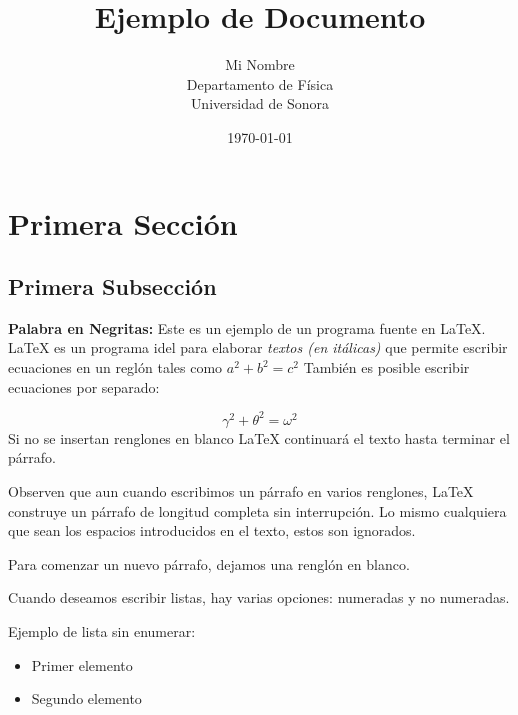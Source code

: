 \documentclass{article}
\title{Ejemplo de Documento}
\author{Mi Nombre \\
             Departamento de Física \\
             Universidad de Sonora}
\date{\today}
\begin{document}
  

\maketitle 
    
\section{Primera Sección} 
\subsection{Primera Subsección}

    
\textbf{Palabra en Negritas:} Este es un ejemplo de un programa fuente en \LaTeX.
     \LaTeX{} es un programa idel para elaborar \textit{textos (en itálicas)} que permite 
escribir ecuaciones
en un reglón tales como 
      $a^2+b^2=c^2$ 
También es posible escribir ecuaciones por separado:

    \begin{equation} 
    \gamma^2+\theta^2=\omega^2
    \end{equation}
Si no se insertan renglones en blanco \LaTeX{} continuará el texto hasta terminar el párrafo. 
 
Observen que aun cuando escribimos un párrafo en 
varios renglones, \LaTeX{} construye un párrafo de
longitud completa sin interrupción. Lo mismo        cualquiera     que sean   los    espacios   introducidos
en                        el                texto, estos      son ignorados.
 
Para comenzar un nuevo párrafo, dejamos una renglón en blanco. 
 
Cuando deseamos escribir listas, hay varias opciones: numeradas y no numeradas.
 
Ejemplo de lista sin enumerar:
\begin{itemize}
\item {Primer elemento}
\item {Segundo elemento}
\end{itemize}
 
\end{document}
